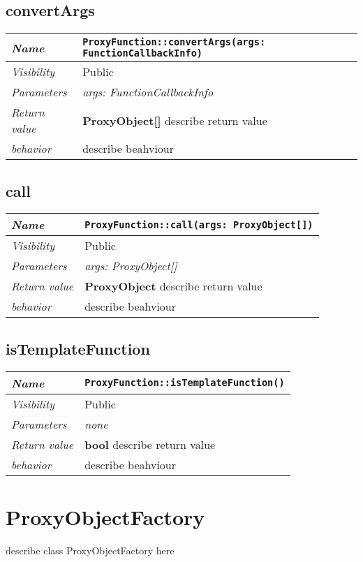  \section{convertArgs}
\begin{longtable}{p{3cm} @{\hskip 1cm} p{12cm}}
 \hline
\textit{Name} & \texttt{ProxyFunction::convertArgs(args: FunctionCallbackInfo)}\\
\hline
 \textit{Visibility} & Public \\
\hline
\textit{Parameters} & \textit{args: FunctionCallbackInfo}\\
\hline
\textit{Return value} & \textbf{ ProxyObject[]} describe return value\\
  \hline
 \textit{behavior} & describe beahviour \\
\hline
\end{longtable} \pagebreak
 \section{call}
\begin{longtable}{p{3cm} @{\hskip 1cm} p{12cm}}
 \hline
\textit{Name} & \texttt{ProxyFunction::call(args: ProxyObject[])}\\
\hline
 \textit{Visibility} & Public \\
\hline
\textit{Parameters} & \textit{args: ProxyObject[]}\\
\hline
\textit{Return value} & \textbf{ ProxyObject} describe return value\\
  \hline
 \textit{behavior} & describe beahviour \\
\hline
\end{longtable} \pagebreak
 \section{isTemplateFunction}
\begin{longtable}{p{3cm} @{\hskip 1cm} p{12cm}}
 \hline
\textit{Name} & \texttt{ProxyFunction::isTemplateFunction()}\\
\hline
 \textit{Visibility} & Public \\
\hline
\textit{Parameters} & \textit{none}\\
\hline
\textit{Return value} & \textbf{ bool} describe return value\\
  \hline
 \textit{behavior} & describe beahviour \\
\hline
\end{longtable} \pagebreak
 \chapter{ProxyObjectFactory}
describe class ProxyObjectFactory here
